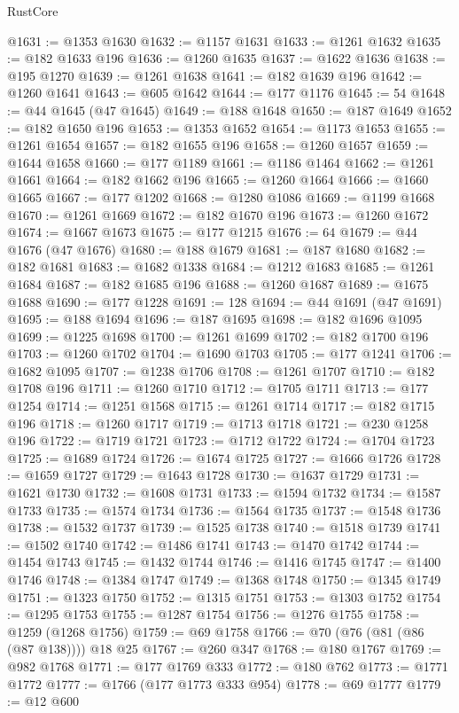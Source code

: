 \begin{lexlean}{RustCore}
\begin{coremodule}
@1631 := @1353 @1630
@1632 := @1157 @1631
@1633 := @1261 @1632
@1635 := @182 @1633 @196
@1636 := @1260 @1635
@1637 := @1622 @1636
@1638 := @195 @1270
@1639 := @1261 @1638
@1641 := @182 @1639 @196
@1642 := @1260 @1641
@1643 := @605 @1642
@1644 := @177 @1176
@1645 := 54
@1648 := @44 @1645 (@47 @1645)
@1649 := @188 @1648
@1650 := @187 @1649
@1652 := @182 @1650 @196
@1653 := @1353 @1652
@1654 := @1173 @1653
@1655 := @1261 @1654
@1657 := @182 @1655 @196
@1658 := @1260 @1657
@1659 := @1644 @1658
@1660 := @177 @1189
@1661 := @1186 @1464
@1662 := @1261 @1661
@1664 := @182 @1662 @196
@1665 := @1260 @1664
@1666 := @1660 @1665
@1667 := @177 @1202
@1668 := @1280 @1086
@1669 := @1199 @1668
@1670 := @1261 @1669
@1672 := @182 @1670 @196
@1673 := @1260 @1672
@1674 := @1667 @1673
@1675 := @177 @1215
@1676 := 64
@1679 := @44 @1676 (@47 @1676)
@1680 := @188 @1679
@1681 := @187 @1680
@1682 := @182 @1681
@1683 := @1682 @1338
@1684 := @1212 @1683
@1685 := @1261 @1684
@1687 := @182 @1685 @196
@1688 := @1260 @1687
@1689 := @1675 @1688
@1690 := @177 @1228
@1691 := 128
@1694 := @44 @1691 (@47 @1691)
@1695 := @188 @1694
@1696 := @187 @1695
@1698 := @182 @1696 @1095
@1699 := @1225 @1698
@1700 := @1261 @1699
@1702 := @182 @1700 @196
@1703 := @1260 @1702
@1704 := @1690 @1703
@1705 := @177 @1241
@1706 := @1682 @1095
@1707 := @1238 @1706
@1708 := @1261 @1707
@1710 := @182 @1708 @196
@1711 := @1260 @1710
@1712 := @1705 @1711
@1713 := @177 @1254
@1714 := @1251 @1568
@1715 := @1261 @1714
@1717 := @182 @1715 @196
@1718 := @1260 @1717
@1719 := @1713 @1718
@1721 := @230 @1258 @196
@1722 := @1719 @1721
@1723 := @1712 @1722
@1724 := @1704 @1723
@1725 := @1689 @1724
@1726 := @1674 @1725
@1727 := @1666 @1726
@1728 := @1659 @1727
@1729 := @1643 @1728
@1730 := @1637 @1729
@1731 := @1621 @1730
@1732 := @1608 @1731
@1733 := @1594 @1732
@1734 := @1587 @1733
@1735 := @1574 @1734
@1736 := @1564 @1735
@1737 := @1548 @1736
@1738 := @1532 @1737
@1739 := @1525 @1738
@1740 := @1518 @1739
@1741 := @1502 @1740
@1742 := @1486 @1741
@1743 := @1470 @1742
@1744 := @1454 @1743
@1745 := @1432 @1744
@1746 := @1416 @1745
@1747 := @1400 @1746
@1748 := @1384 @1747
@1749 := @1368 @1748
@1750 := @1345 @1749
@1751 := @1323 @1750
@1752 := @1315 @1751
@1753 := @1303 @1752
@1754 := @1295 @1753
@1755 := @1287 @1754
@1756 := @1276 @1755
@1758 := @1259 (@1268 @1756)
@1759 := @69 @1758
@1766 := @70 (@76 (@81 (@86 (@87 @138)))) @18 @25
@1767 := @260 @347
@1768 := @180 @1767
@1769 := @982 @1768
@1771 := @177 @1769 @333
@1772 := @180 @762
@1773 := @1771 @1772
@1777 := @1766 (@177 @1773 @333 @954)
@1778 := @69 @1777
@1779 := @12 @600

\end{coremodule}
\end{lexlean}

